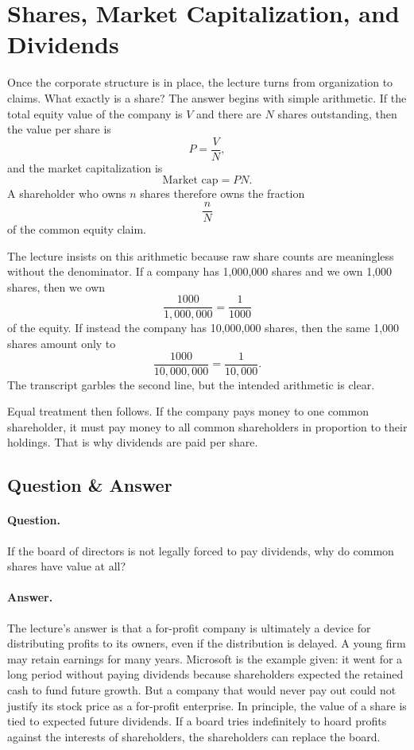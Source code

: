 \section{Shares, Market Capitalization, and Dividends}

Once the corporate structure is in place, the lecture turns from organization to claims. What exactly is a share? The answer begins with simple arithmetic. If the total equity value of the company is $V$ and there are $N$ shares outstanding, then the value per share is
\begin{equation}
P=\frac{V}{N},
\end{equation}
and the market capitalization is
\begin{equation}
\text{Market cap}=PN.
\end{equation}
A shareholder who owns $n$ shares therefore owns the fraction
\begin{equation}
\frac{n}{N}
\end{equation}
of the common equity claim.

The lecture insists on this arithmetic because raw share counts are meaningless without the denominator. If a company has 1,000,000 shares and we own 1,000 shares, then we own
\[
\frac{1000}{1{,}000{,}000}=\frac{1}{1000}
\]
of the equity. If instead the company has 10,000,000 shares, then the same 1,000 shares amount only to
\[
\frac{1000}{10{,}000{,}000}=\frac{1}{10{,}000}.
\]
The transcript garbles the second line, but the intended arithmetic is clear.

Equal treatment then follows. If the company pays money to one common shareholder, it must pay money to all common shareholders in proportion to their holdings. That is why dividends are paid per share.

\subsection{Question \& Answer}

\paragraph{Question.} If the board of directors is not legally forced to pay dividends, why do common shares have value at all?

\paragraph{Answer.} The lecture's answer is that a for-profit company is ultimately a device for distributing profits to its owners, even if the distribution is delayed. A young firm may retain earnings for many years. Microsoft is the example given: it went for a long period without paying dividends because shareholders expected the retained cash to fund future growth. But a company that would never pay out could not justify its stock price as a for-profit enterprise. In principle, the value of a share is tied to expected future dividends. If a board tries indefinitely to hoard profits against the interests of shareholders, the shareholders can replace the board.

